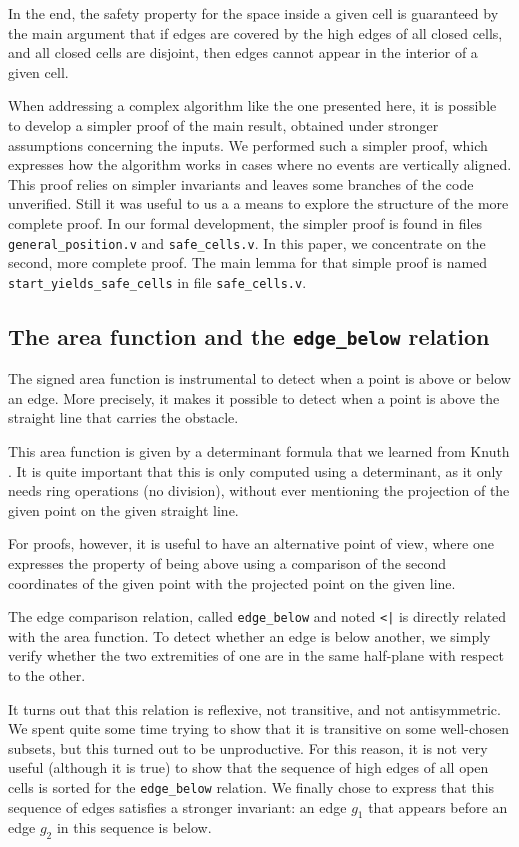 \documentclass[a4paper, USenglish, cleveref, autoref, thm-restate, final]{lipics-v2021}
\begin{document}
In the end, the safety property for the space inside a given cell is
guaranteed by the main argument that if edges are covered by the high
edges of all closed cells, and all closed cells are disjoint, then
edges cannot appear in the interior of a given cell.

When addressing a complex algorithm like the one presented here, it is
possible to develop a simpler proof of the main result, obtained under
stronger assumptions concerning the inputs.  We performed such a
simpler proof, which expresses how the algorithm works in cases where
no events are vertically aligned.  This proof relies on simpler
invariants and leaves some branches of the code unverified.  Still it
was useful to us a a means to explore the structure of the more
complete proof.  In our formal development, the simpler proof is found in files
{\tt general\_position.v} and {\tt safe\_cells.v}.
In this paper, we concentrate on the second, more complete proof.  The
main lemma for that simple proof is named {\tt
  start\_yields\_safe\_cells} in file {\tt safe\_cells.v}.

\subsection{The area function and the {\tt edge\_below} relation}
The signed area function is instrumental to detect when a point is above or
below an edge.  More precisely, it makes it possible to detect when a
point is above the straight line that carries the obstacle.

This area function is given by a determinant formula that we learned
from Knuth \cite{KnuthAxiomsHulls}.
It is quite important that this is only computed using a
determinant, as it only needs ring operations (no division), without
ever mentioning the projection of the given point on the given
straight line.

For proofs, however, it is useful to have an alternative point of view,
where one expresses the property of being above using a comparison of
the second coordinates of the given point with the projected point on
the given line.

The edge comparison relation, called {\tt edge\_below} and
noted {\tt <|} is directly related with the area
function.  To detect whether an edge is below another, we simply
verify whether the two extremities of one are in the same half-plane
with respect to the other.

It turns out that this relation is reflexive, not transitive, and not
antisymmetric.  We spent quite some time trying to show that it is transitive
on some well-chosen subsets, but this turned out to be unproductive.  For
this reason, it is not very useful (although it is true) to show that the
sequence of high edges of all open cells is sorted for the {\tt edge\_below}
relation.  We
finally chose to express that this sequence of edges
satisfies a stronger invariant: an edge \(g_1\) that appears before an edge
\(g_2\) in this sequence is below.
\end{document}
